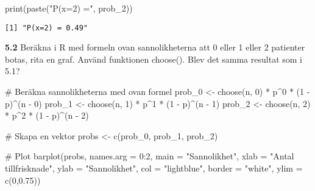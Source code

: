 \documentclass[
  letterpaper,
  DIV=11,
  numbers=noendperiod]{scrartcl}
\newenvironment{Shaded}{\begin{snugshade}}{\end{snugshade}}
\newcommand{\AttributeTok}[1]{\textcolor[rgb]{0.40,0.45,0.13}{#1}}
\newcommand{\CommentTok}[1]{\textcolor[rgb]{0.37,0.37,0.37}{#1}}
\newcommand{\DecValTok}[1]{\textcolor[rgb]{0.68,0.00,0.00}{#1}}
\newcommand{\FloatTok}[1]{\textcolor[rgb]{0.68,0.00,0.00}{#1}}
\newcommand{\FunctionTok}[1]{\textcolor[rgb]{0.28,0.35,0.67}{#1}}
\newcommand{\NormalTok}[1]{\textcolor[rgb]{0.00,0.23,0.31}{#1}}
\newcommand{\OtherTok}[1]{\textcolor[rgb]{0.00,0.23,0.31}{#1}}
\newcommand{\SpecialCharTok}[1]{\textcolor[rgb]{0.37,0.37,0.37}{#1}}
\newcommand{\StringTok}[1]{\textcolor[rgb]{0.13,0.47,0.30}{#1}}
\begin{document}
\begin{Shaded}
\begin{Highlighting}[]
\FunctionTok{print}\NormalTok{(}\FunctionTok{paste}\NormalTok{(}\StringTok{"P(x=2) ="}\NormalTok{, prob\_2))}
\end{Highlighting}
\end{Shaded}

\begin{verbatim}
[1] "P(x=2) = 0.49"
\end{verbatim}

\textbf{5.2} Beräkna i R med formeln ovan sannolikheterna att 0 eller 1
eller 2 patienter botas, rita en graf. Använd funktionen choose(). Blev
det samma resultat som i 5.1?

\begin{Shaded}
\begin{Highlighting}[]
\CommentTok{\# Beräkna sannolikheterna med ovan formel}
\NormalTok{prob\_0 }\OtherTok{\textless{}{-}} \FunctionTok{choose}\NormalTok{(n, }\DecValTok{0}\NormalTok{) }\SpecialCharTok{*}\NormalTok{ p}\SpecialCharTok{\^{}}\DecValTok{0} \SpecialCharTok{*}\NormalTok{ (}\DecValTok{1} \SpecialCharTok{{-}}\NormalTok{ p)}\SpecialCharTok{\^{}}\NormalTok{(n }\SpecialCharTok{{-}} \DecValTok{0}\NormalTok{)}
\NormalTok{prob\_1 }\OtherTok{\textless{}{-}} \FunctionTok{choose}\NormalTok{(n, }\DecValTok{1}\NormalTok{) }\SpecialCharTok{*}\NormalTok{ p}\SpecialCharTok{\^{}}\DecValTok{1} \SpecialCharTok{*}\NormalTok{ (}\DecValTok{1} \SpecialCharTok{{-}}\NormalTok{ p)}\SpecialCharTok{\^{}}\NormalTok{(n }\SpecialCharTok{{-}} \DecValTok{1}\NormalTok{)}
\NormalTok{prob\_2 }\OtherTok{\textless{}{-}} \FunctionTok{choose}\NormalTok{(n, }\DecValTok{2}\NormalTok{) }\SpecialCharTok{*}\NormalTok{ p}\SpecialCharTok{\^{}}\DecValTok{2} \SpecialCharTok{*}\NormalTok{ (}\DecValTok{1} \SpecialCharTok{{-}}\NormalTok{ p)}\SpecialCharTok{\^{}}\NormalTok{(n }\SpecialCharTok{{-}} \DecValTok{2}\NormalTok{)}

\CommentTok{\# Skapa en vektor}
\NormalTok{probs }\OtherTok{\textless{}{-}} \FunctionTok{c}\NormalTok{(prob\_0, prob\_1, prob\_2)}

\CommentTok{\# Plot}
\FunctionTok{barplot}\NormalTok{(probs, }\AttributeTok{names.arg =} \DecValTok{0}\SpecialCharTok{:}\DecValTok{2}\NormalTok{, }\AttributeTok{main =} \StringTok{"Sannolikhet"}\NormalTok{, }\AttributeTok{xlab =} \StringTok{"Antal tillfrisknade"}\NormalTok{, }\AttributeTok{ylab =} \StringTok{"Sannolikhet"}\NormalTok{, }\AttributeTok{col =} \StringTok{"lightblue"}\NormalTok{, }\AttributeTok{border =} \StringTok{"white"}\NormalTok{, }\AttributeTok{ylim =} \FunctionTok{c}\NormalTok{(}\DecValTok{0}\NormalTok{,}\FloatTok{0.75}\NormalTok{))}
\end{Highlighting}
\end{Shaded}
\end{document}
